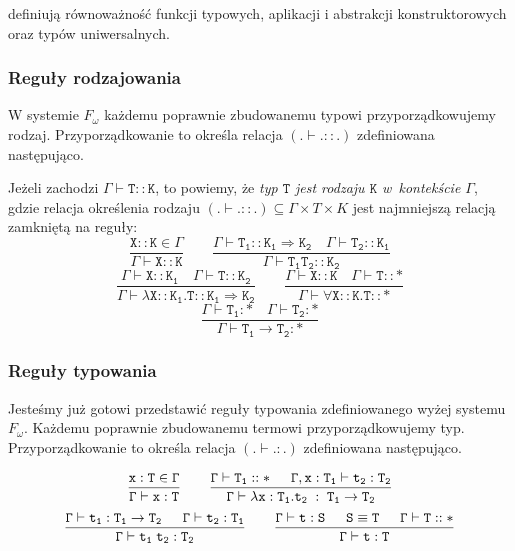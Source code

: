 \documentclass[11pt,leqno]{article}
\begin{document}
definiują równoważność funkcji typowych, aplikacji i abstrakcji konstruktorowych oraz typów uniwersalnych.

\subsubsection{Reguły rodzajowania}

W systemie $F_\omega$ każdemu poprawnie zbudowanemu typowi przyporządkowujemy rodzaj.
Przyporządkowanie to określa relacja $(.\vdash.::.)$ zdefiniowana następująco.

Jeżeli zachodzi $\mathtt{\Gamma \vdash T :: K}$, to powiemy, że
\emph {typ $\mathtt{T}$ jest rodzaju $\mathtt{K}$ w~kontekście $\mathtt{\Gamma}$}, gdzie
relacja określenia rodzaju $(.\vdash.::.) \subseteq \Gamma \times T \times K$
jest najmniejszą relacją zamkniętą na reguły:
	\[ \mathtt{
		\frac{X::K \in \Gamma}{\Gamma \vdash X::K}
		\qquad
		\frac{\Gamma \vdash T_1 :: K_{1} \Rightarrow K_{2} \hspace{1em} \Gamma \vdash T_2 :: K_{1}}{\Gamma \vdash T_1 T_2 :: K_{2}}}
	\]
	\[ \mathtt{
		\frac{\Gamma \vdash X :: K_1 \hspace{1em} \Gamma \vdash T :: K_2}{\Gamma \vdash \lambda X::K_1. T :: K_{1} \Rightarrow K_{2}}
		\qquad
		\frac{\Gamma \vdash X :: K \hspace{1em} \Gamma \vdash T :: \ast}{\Gamma \vdash \forall X::K. T :: \ast}}
	\]
	\[\mathtt{
		\frac{\Gamma \vdash T_1 : \ast \hspace{1em} \Gamma \vdash T_2 : \ast}{\Gamma \vdash T_1 \rightarrow T_2 : \ast}}
	\]	


\subsubsection{Reguły typowania}

Jesteśmy już gotowi przedstawić reguły typowania zdefiniowanego wyżej systemu $F_\omega$.
Każdemu poprawnie zbudowanemu termowi przyporządkowujemy typ. Przyporządkowanie to określa relacja $(.\vdash.:.)$ zdefiniowana następująco.

	\[\mathtt{
		\frac{x:T \in \Gamma}{\Gamma \vdash x:T}
                \qquad
                \frac{\Gamma \vdash T_1::\ast \hspace{1.5em} \Gamma,x:T_1 \vdash t_2:T_2}{\Gamma \vdash \lambda x:T_1.t_2\;:\;T_1 \rightarrow T_2}}
	\]
	\[\mathtt{
		\frac{\Gamma \vdash t_1:T_1 \rightarrow T_2 \hspace{1.5em} \Gamma \vdash t_2:T_1}{ \Gamma \vdash t_1 \; t_2 : T_2}
                \qquad
                \frac{\Gamma \vdash t:S \hspace{1.5em} S \equiv T \hspace{1.5em} \Gamma \vdash T::\ast}{\Gamma \vdash t:T}}
	\]
\end{document}
